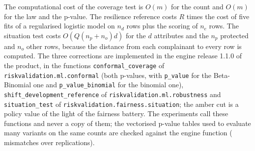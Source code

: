The computational cost of the coverage test is $O(m)$ for the count and $O(m)$ for the law and the p-value. The resilience reference costs $R$ times the cost of five fits of a regularised logistic model on $n_d$ rows plus the scoring of $n_e$ rows. The situation test costs $O(Q(n_p+n_o)d)$ for the $d$ attributes and the $n_p$ protected and $n_o$ other rows, because the distance from each complainant to every row is computed. The three corrections are implemented in the engine release 1.1.0 of the product, in the functions \texttt{conformal\_coverage} of \texttt{riskvalidation.ml.conformal} (both p-values, with \texttt{p\_value} for the Beta-Binomial one and \texttt{p\_value\_binomial} for the binomial one), \texttt{shift\_development\_reference} of \texttt{riskvalidation.ml.robustness} and \texttt{situation\_test} of \texttt{riskvalidation.fairness.situation}; the amber cut is a policy value of the light of the fairness battery. The experiments call these functions and never a copy of them; the vectorised p-value tables used to evaluate many variants on the same counts are checked against the engine function (\CovEngineMismatches{} mismatches over \CovTotalReps{} replications).

